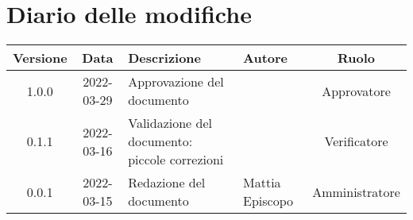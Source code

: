 \section*{Diario delle modifiche}
	\begin{center}
	\renewcommand{\arraystretch}{1.8}
	\begin{tabular}{ |c|c|m{12em}|m{7em}|c| }
	\hline
	\textbf{Versione} & \textbf{Data} & \textbf{Descrizione} &  \textbf{Autore} &  \textbf{Ruolo} \\
	\hline
	1.0.0 & 2022-03-29 & Approvazione del documento & \docApprovazione & Approvatore\\
	\hline
	0.1.1 & 2022-03-16 & Validazione del documento: piccole correzioni & \docVerificatori & Verificatore\\
	\hline
	0.0.1 & 2022-03-15 & Redazione del documento & Mattia \newline Episcopo & Amministratore\\
	\hline
	\end{tabular}
	\end{center}
	\newpage